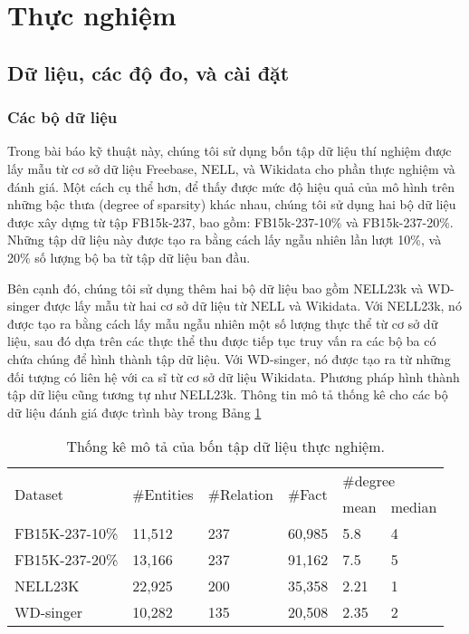 \section{Thực nghiệm}

\subsection{Dữ liệu, các độ đo, và cài đặt}

\subsubsection{Các bộ dữ liệu}

Trong bài báo kỹ thuật này, chúng tôi sử dụng bốn tập dữ liệu thí nghiệm được lấy mẫu từ cơ sở dữ liệu Freebase\cite{bollacker2008freebase}, NELL\cite{carlson2010toward}, và Wikidata\cite{vrandevcic2014wikidata} cho phần thực nghiệm và đánh giá. Một cách cụ thể hơn, để thấy được mức độ hiệu quả của mô hình trên những bậc thưa (degree of sparsity) khác nhau, chúng tôi sử dụng hai bộ dữ liệu được xây dựng từ tập FB15k-237\cite{toutanova2015representing}, bao gồm: FB15k-237-10\% và FB15k-237-20\%. Những tập dữ liệu này được tạo ra bằng cách lấy ngẫu nhiên lần lượt 10\%, và 20\% số lượng bộ ba từ tập dữ liệu ban đầu.

Bên cạnh đó, chúng tôi sử dụng thêm hai bộ dữ liệu bao gồm NELL23k và WD-singer được lấy mẫu từ hai cơ sở dữ liệu từ NELL và Wikidata. Với NELL23k, nó được tạo ra bằng cách lấy mẫu ngẫu nhiên một số lượng thực thể từ cơ sở dữ liệu, sau đó dựa trên các thực thể thu được tiếp tục truy vấn ra các bộ ba có chứa chúng để hình thành tập dữ liệu. Với WD-singer, nó được tạo ra từ những đối tượng có liên hệ với ca sĩ từ cơ sở dữ liệu Wikidata. Phương pháp hình thành tập dữ liệu cũng tương tự như NELL23k. Thông tin mô tả thống kê cho các bộ dữ liệu đánh giá được trình bày trong Bảng \ref{tab:dataset}

\begin{center}
    \begin{table}[H]
        \label{tab:dataset}
        \centering
        \caption{Thống kê mô tả của bốn tập dữ liệu thực nghiệm.}
        \begin{tabular}{llllll}
        \toprule
        \multirow{2}{*}{Dataset} & \multirow{2}{*}{\#Entities} & \multirow{2}{*}{\#Relation} & \multirow{2}{*}{\#Fact} & \multicolumn{2}{l}{\#degree}    \\ \cline{5-6}
        &&&& \multicolumn{1}{l}{mean} & median \\ \midrule
        FB15K-237-10\%&11,512&237&60,985&\multicolumn{1}{l}{5.8}&4\\
        FB15K-237-20\%&13,166&237&91,162&\multicolumn{1}{l}{7.5}&5\\
        NELL23K&22,925&200&35,358&\multicolumn{1}{l}{2.21}&1\\
        WD-singer&10,282&135&20,508&\multicolumn{1}{l}{2.35}&2\\
        \bottomrule
        \end{tabular}
    \end{table}
\end{center}

